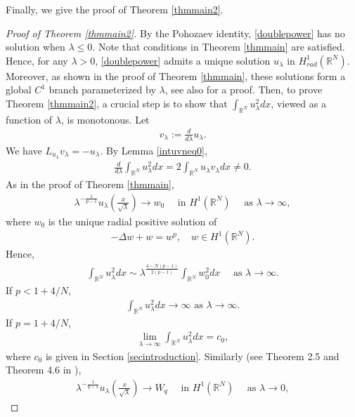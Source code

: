 \documentclass{article}
\theoremstyle{definition} \theoremstyle{remark}
\numberwithin{equation}{section}
\newcommand{\R}{\mathbb{R}}
\newcommand{\la}{\lambda}
\begin{document}
	Finally, we give the proof of Theorem \ref{thmmain2}.
	
	\begin{proof}[Proof of Theorem \ref{thmmain2}]
		By the Pohozaev identity, \eqref{doublepower} has no solution when $\la \le 0$. Note that conditions in Theorem \ref{thmmain} are satisfied. Hence, for any $\la > 0$, \eqref{doublepower} admits a unique solution $u_\la$ in $H^1_{rad}(\R^N)$. Moreover, as shown in the proof of Theorem \ref{thmmain}, these solutions form a global $C^1$ branch parameterized by $\la$, see also \cite{Song} for a proof. Then, to prove Theorem \ref{thmmain2}, a crucial step is to show that $\int_{\R^N}u_\la^2dx$, viewed as a function of $\la$, is monotonous. Let
		\begin{align*}
			v_\la := \frac{d}{d\la}u_\la.
		\end{align*}
		We have $L_{u_\la}v_\la = - u_\la$. By Lemma \ref{intuvneq0},
		\begin{align} \label{ulavla}
			\frac{d}{d\la}\int_{\R^N}u_\la^2dx = 2\int_{\R^N} u_\la v_\la dx \neq 0.
		\end{align}
		As in the proof of Theorem \ref{thmmain},
		\begin{align*}
			\la^{-\frac{1}{p-1}}u_\la\left(\frac{x}{\sqrt{\la}}\right) \to w_0 \quad \text{ in } H^1(\R^N) \quad \text{ as } \la \to \infty,
		\end{align*}
		where $w_0$ is the unique radial positive solution of
		\begin{align*}
			-\Delta w + w = w^p, \quad w \in H^1(\R^N).
		\end{align*}
		Hence,
		\begin{align*}
			\int_{\R^N}u_\la^2dx \sim \la^{\frac{4-N(p-1)}{2(p-1)}}\int_{\R^N}w_0^2dx \quad \text{ as } \la \to \infty.
		\end{align*}
		If $p <  1 + 4/N$,
		\begin{align*}
			\int_{\R^N}u_\la^2dx \to \infty \text{ as } \la \to \infty.
		\end{align*}
		If $p = 1 + 4/N$,
		\begin{align*}
			\lim_{\la \to \infty}\int_{\R^N}u_\la^2dx = c_0,
		\end{align*}
		where $c_0$ is given in Section \ref{secintroduction}.  Similarly (see
		Theorem 2.5 and Theorem 4.6 in \cite{JZZ}),
		\begin{align*}
			\la^{-\frac{1}{q-1}}u_\la\left(\frac{x}{\sqrt{\la}}\right) \to W_q \quad \text{ in } H^1(\R^N) \quad \text{ as } \la \to 0,
		\end{align*}

\end{proof}
\end{document}
